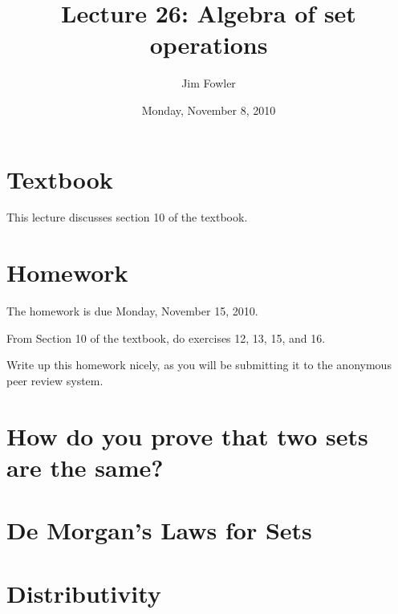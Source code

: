 \documentclass[12pt]{handout}
\title{Lecture 26: Algebra of set operations}
\author{Jim Fowler}
\date{Monday, November  8, 2010}
\begin{document}
\maketitle

\section*{Textbook}
This lecture discusses section 10 of the textbook.

\section*{Homework} 

The homework is due Monday, November 15, 2010.

From Section 10 of the textbook, do exercises 12, 13, 15, and 16.

Write up this homework nicely, as you will be submitting it to the
anonymous peer review system.

\section*{How do you prove that two sets are the same?}

\section*{De Morgan's Laws for Sets}

\section*{Distributivity}
\end{document}
